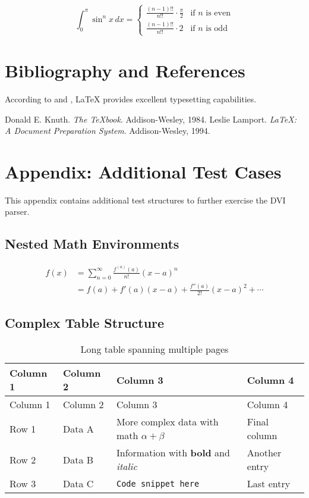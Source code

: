 \documentclass[12pt]{article}
\newcommand{\code}[1]{\texttt{#1}}
\begin{document}
\begin{equation}
\int_0^{\pi} \sin^n x \, dx = \begin{cases}
\frac{(n-1)!!}{n!!} \cdot \frac{\pi}{2} & \text{if } n \text{ is even} \\
\frac{(n-1)!!}{n!!} \cdot 2 & \text{if } n \text{ is odd}
\end{cases}
\end{equation}

\section{Bibliography and References}

According to \cite{knuth1984} and \cite{lamport1994}, \LaTeX{} provides excellent typesetting capabilities.

\begin{thebibliography}{99}
 Donald E. Knuth. \textit{The \TeX{}book}. Addison-Wesley, 1984.
 Leslie Lamport. \textit{\LaTeX{}: A Document Preparation System}. Addison-Wesley, 1994.
\end{thebibliography}

\appendix

\section{Appendix: Additional Test Cases}
\label{sec:appendix}

This appendix contains additional test structures to further exercise the DVI parser.

\subsection{Nested Math Environments}
\begin{equation}
\begin{aligned}
f(x) &= \sum_{n=0}^{\infty} \frac{f^{(n)}(a)}{n!}(x-a)^n \\
&= f(a) + f'(a)(x-a) + \frac{f''(a)}{2!}(x-a)^2 + \cdots
\end{aligned}
\end{equation}

\subsection{Complex Table Structure}
\begin{longtable}{|p{2cm}|p{3cm}|p{4cm}|p{3cm}|}
\caption{Long table spanning multiple pages} \\
\hline
Column 1 & Column 2 & Column 3 & Column 4 \\
\hline
\endfirsthead
\hline
Column 1 & Column 2 & Column 3 & Column 4 \\
\hline
\endhead
\hline
\endfoot
\hline
\endlastfoot

Row 1 & Data A & More complex data with math $\alpha + \beta$ & Final column \\
Row 2 & Data B & Information with \textbf{bold} and \textit{italic} & Another entry \\
Row 3 & Data C & \code{Code snippet here} & Last entry \\
\end{longtable}
\end{document}
